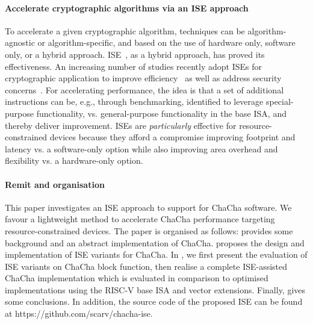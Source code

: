 \paragraph{Accelerate cryptographic algorithms via an ISE approach}
To accelerate a given cryptographic algorithm, techniques can be algorithm-agnostic or algorithm-specific, and based on the use of hardware only, software only, or a hybrid approach. 
ISE~\cite{GalBer:11,BarGioMar:09,RegIen:16}, as a hybrid approach, has proved its effectiveness. 
An increasing number of studies recently adopt ISEs for cryptographic application to improve efficiency~\cite{RCB:20,MNPSW:21} as well as address security concerns~\cite{GMPP:20}. 
For accelerating performance, the idea is that a set of additional instructions can be, e.g., through benchmarking, identified to leverage special-purpose functionality, 
vs. general-purpose functionality in the base ISA, and thereby deliver improvement.
ISEs are {\em particularly} effective for resource-constrained devices 
because they afford a compromise improving footprint and latency vs. a software-only option 
while also improving area overhead and flexibility vs. a hardware-only option.

\paragraph{Remit and organisation}
This paper investigates an ISE approach to support for ChaCha software. We favour a lightweight method to accelerate ChaCha performance targeting resource-constrained devices. The paper is organised as follows:
 provides some background and an abstract implementation of ChaCha.
 proposes the design and implementation of ISE variants for ChaCha. 
In , we first present the evaluation of ISE variants on ChaCha block function, then realise a complete ISE-assisted ChaCha implementation which is evaluated in comparison to optimised implementations using the RISC-V base ISA and vector extensions. 
Finally,  gives some conclusions. In addition, the source code of the proposed ISE can be found at https://github.com/scarv/chacha-ise.
